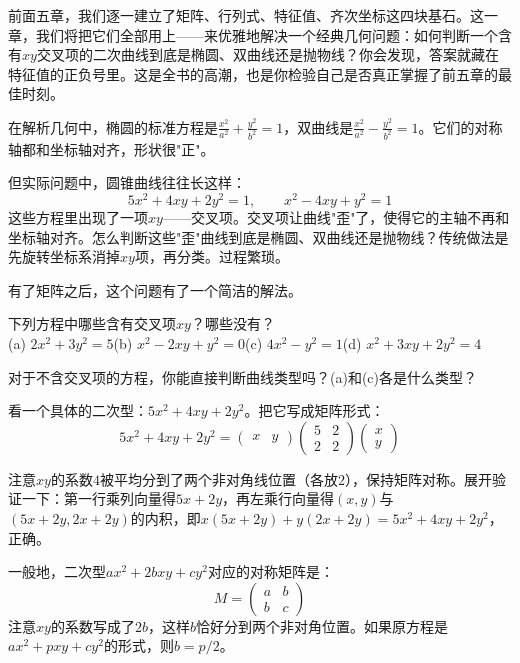 
前面五章，我们逐一建立了矩阵、行列式、特征值、齐次坐标这四块基石。这一章，我们将把它们全部用上——来优雅地解决一个经典几何问题：如何判断一个含有$xy$交叉项的二次曲线到底是椭圆、双曲线还是抛物线？你会发现，答案就藏在特征值的正负号里。这是全书的高潮，也是你检验自己是否真正掌握了前五章的最佳时刻。


在解析几何中，椭圆的标准方程是$\frac{x^2}{a^2}+\frac{y^2}{b^2}=1$，双曲线是$\frac{x^2}{a^2}-\frac{y^2}{b^2}=1$。它们的对称轴都和坐标轴对齐，形状很"正"。

但实际问题中，圆锥曲线往往长这样：
\[
5x^2+4xy+2y^2=1,\qquad
x^2-4xy+y^2=1
\]
这些方程里出现了一项$xy$——交叉项。交叉项让曲线"歪"了，使得它的主轴不再和坐标轴对齐。怎么判断这些"歪"曲线到底是椭圆、双曲线还是抛物线？传统做法是先旋转坐标系消掉$xy$项，再分类。过程繁琐。

有了矩阵之后，这个问题有了一个简洁的解法。

\begin{exercise}
\item 下列方程中哪些含有交叉项$xy$？哪些没有？\\
(a) $2x^2+3y^2=5$\quad (b) $x^2-2xy+y^2=0$\quad (c) $4x^2-y^2=1$\quad (d) $x^2+3xy+2y^2=4$
\item 对于不含交叉项的方程，你能直接判断曲线类型吗？(a)和(c)各是什么类型？
\end{exercise}


看一个具体的二次型：$5x^2+4xy+2y^2$。把它写成矩阵形式：
\[
5x^2+4xy+2y^2=
\begin{pmatrix}x&y\end{pmatrix}
\begin{pmatrix}5&2\\2&2\end{pmatrix}
\begin{pmatrix}x\\y\end{pmatrix}
\]

注意$xy$的系数$4$被平均分到了两个非对角线位置（各放$2$），保持矩阵对称。展开验证一下：第一行乘列向量得$5x+2y$，再左乘行向量得$(x,y)$与$(5x+2y,2x+2y)$的内积，即$x(5x+2y)+y(2x+2y)=5x^2+4xy+2y^2$，正确。

一般地，二次型$ax^2+2bxy+cy^2$对应的对称矩阵是：
\[
M = \begin{pmatrix}a&b\\b&c\end{pmatrix}
\]
注意$xy$的系数写成了$2b$，这样$b$恰好分到两个非对角位置。如果原方程是$ax^2+pxy+cy^2$的形式，则$b=p/2$。

